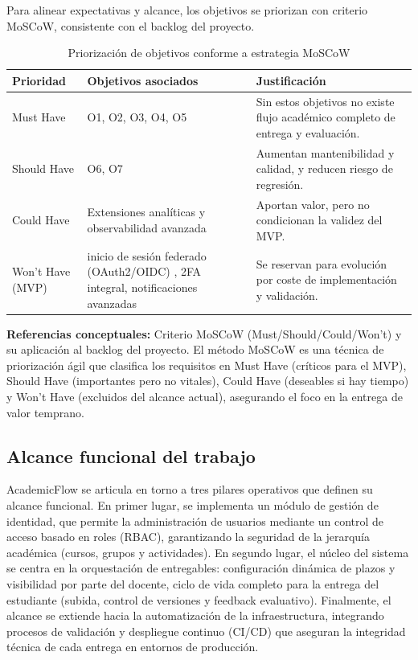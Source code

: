 Para alinear expectativas y alcance,
los objetivos se priorizan con criterio MoSCoW,
consistente con el backlog del proyecto.

\begin{table}[!htbp]
\centering
\begin{tabular}{|P{2.2cm}|P{4.8cm}|P{5.4cm}|}
\hline
\textbf{Prioridad} & \textbf{Objetivos asociados} & \textbf{Justificaci\'on} \\
\hline
Must Have & O1, O2, O3, O4, O5 & Sin estos objetivos no existe flujo acad\'emico completo de entrega y evaluaci\'on. \\
\hline
Should Have & O6, O7 & Aumentan mantenibilidad y calidad, y reducen riesgo de regresi\'on. \\
\hline
Could Have & Extensiones anal\'iticas y observabilidad avanzada & Aportan valor, pero no condicionan la validez del MVP. \\
\hline
Won't Have (MVP) & inicio de sesi\'on federado (OAuth2/OIDC) \cite{oauth2}, 2FA integral, notificaciones avanzadas & Se reservan para evoluci\'on por coste de implementaci\'on y validaci\'on. \\
\hline
\end{tabular}
\caption{Priorizaci\'on de objetivos conforme a estrategia MoSCoW}
\label{tab:priorizacion-objetivos}
\end{table}

\noindent\textbf{Referencias conceptuales:} Criterio MoSCoW (Must/Should/Could/Won't) \cite{moscow_method} y su aplicaci\'on al backlog del proyecto. El m\'etodo MoSCoW es una t\'ecnica de priorizaci\'on \'agil que clasifica los requisitos en Must Have (cr\'iticos para el MVP), Should Have (importantes pero no vitales), Could Have (deseables si hay tiempo) y Won't Have (excluidos del alcance actual), asegurando el foco en la entrega de valor temprano.

\subsection{Alcance funcional del trabajo}

AcademicFlow se articula en torno a tres pilares operativos que definen su alcance funcional. En primer lugar, se implementa un m\'odulo de gesti\'on de identidad, que permite la administraci\'on de usuarios mediante un control de acceso basado en roles (RBAC), garantizando la seguridad de la jerarqu\'ia acad\'emica (cursos, grupos y actividades). En segundo lugar, el n\'ucleo del sistema se centra en la orquestaci\'on de entregables: configuraci\'on din\'amica de plazos y visibilidad por parte del docente, ciclo de vida completo para la entrega del estudiante (subida, control de versiones y feedback evaluativo). Finalmente, el alcance se extiende hacia la automatizaci\'on de la infraestructura, integrando procesos de validaci\'on y despliegue continuo (CI/CD) que aseguran la integridad t\'ecnica de cada entrega en entornos de producci\'on.

